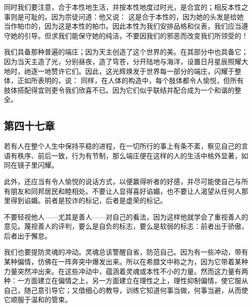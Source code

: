 同时我们要注意，合于本性地生活，并按本性地度过时光，是合宜的；相反本性之事则是可耻的。因为宗徒问道：他又说： 这是合于本性的，因为她的头发是给她当作帕巾的，因为这是本性的帕巾。因此本性为我们安排品格和仪表，我们应当遵守她的引导。但求我们能保守她的纯洁，不要因我们的邪恶而改变我们所领受的！\par

我们具备那种普遍的端庄；因为天主创造了这个世界的美。在其部分中也具备它；因为当天主造了光，分别昼夜，造了穹苍，分开陆地与海洋，设置日月星辰照耀大地时，祂逐一地赞许它们。因此，这光辉焕发于世界每一部分的端庄，闪耀于整体，正如所表明的，说： 同样，在人体的构造中，每个肢体都令人愉悦，但所有肢体搭配得宜则更令我们欣喜不已。因为它们似乎联结并配合成为一个和谐的整全。\par


\subsection{第四十七章}

\par

若有人在整个人生中保持平稳的进程，在一切所行的事上有条不紊，察见自己的言语有秩序、前后一致，行为有节制，那么端庄便在这样的人的生活中格外显著，如同在镜子里闪耀。\par

此外，还应当有令人愉悦的说话方式，以便赢得听者的好感，并尽可能使自己与所有朋友和同邦居民和睦相处。不要让人显得喜好谄媚，也不要让人渴望从任何人那里得到谄媚。前者是狡诈的标记，后者是虚荣的标记。\par

不要轻视他人——尤其是善人——对自己的看法，因为这样他就学会了重视善人的意见。蔑视善人的评判，要么是自负的标志，要么是软弱的标志：前者出于骄傲，后者出于懈怠。\par

我们也要提防灵魂的冲动。灵魂总该警醒自省，防范自己。因为有一些冲动，带有某种偏情，仿佛在一阵奔突中爆发出来。所以在希腊文中称之为，因为它带着某种力量突然冲出来。在这些冲动中，蕴涵着灵魂或本性不小的力量。然而这力量有两种：一方面建立在偏情之上，另一方面建立在理性之上，理性抑制偏情，使它服从自己，随己意引导它；又借细心的教导，训练它知道何事当做，何事当避，从而使它顺服于温和的管束。\par

